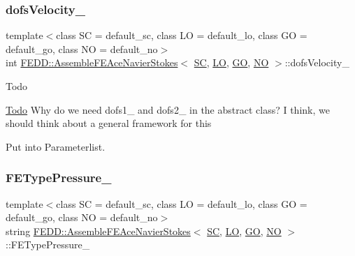 \mbox{\label{classFEDD_1_1AssembleFEAceNavierStokes_ab9f645b7c95c753306f55b0719c320c4}} 
\subsubsection{\texorpdfstring{dofs\+Velocity\+\_\+}{dofsVelocity\_}}
{\footnotesize\ttfamily template$<$class SC  = default\+\_\+sc, class LO  = default\+\_\+lo, class GO  = default\+\_\+go, class NO  = default\+\_\+no$>$ \\
int \hyperlink{classFEDD_1_1AssembleFEAceNavierStokes}{F\+E\+D\+D\+::\+Assemble\+F\+E\+Ace\+Navier\+Stokes}$<$ \hyperlink{fe__test__laplace_8cpp_a79c7e86a57edbb2a5a53242bcd04e41e}{SC}, \hyperlink{fe__test__laplace_8cpp_ad6a38c9f07d3fd633eefca5bccad8410}{LO}, \hyperlink{fe__test__laplace_8cpp_afa2946b509009b4f45eb04bd8c5b27d9}{GO}, \hyperlink{fe__test__laplace_8cpp_a5e24f37b28787429872b6ecb1d0417ce}{NO} $>$\+::dofs\+Velocity\+\_\+\hspace{0.3cm}{\ttfamily [private]}}

\begin{DoxyRefDesc}{Todo}
\item[\hyperlink{todo__todo000008}{Todo}]Why do we need dofs1\+\_\+ and dofs2\+\_\+ in the abstract class? I think, we should think about a general framework for this 

Put into Parameterlist. \end{DoxyRefDesc}
\mbox{\label{classFEDD_1_1AssembleFEAceNavierStokes_a96a5a860ce08afa0a42461e446522ace}} 
\subsubsection{\texorpdfstring{F\+E\+Type\+Pressure\+\_\+}{FETypePressure\_}}
{\footnotesize\ttfamily template$<$class SC  = default\+\_\+sc, class LO  = default\+\_\+lo, class GO  = default\+\_\+go, class NO  = default\+\_\+no$>$ \\
string \hyperlink{classFEDD_1_1AssembleFEAceNavierStokes}{F\+E\+D\+D\+::\+Assemble\+F\+E\+Ace\+Navier\+Stokes}$<$ \hyperlink{fe__test__laplace_8cpp_a79c7e86a57edbb2a5a53242bcd04e41e}{SC}, \hyperlink{fe__test__laplace_8cpp_ad6a38c9f07d3fd633eefca5bccad8410}{LO}, \hyperlink{fe__test__laplace_8cpp_afa2946b509009b4f45eb04bd8c5b27d9}{GO}, \hyperlink{fe__test__laplace_8cpp_a5e24f37b28787429872b6ecb1d0417ce}{NO} $>$\+::F\+E\+Type\+Pressure\+\_\+\hspace{0.3cm}{\ttfamily [private]}}


